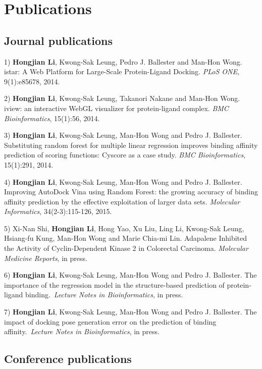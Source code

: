 \chapter{Publications}

\section{Journal publications}

1) \textbf{Hongjian Li}, Kwong-Sak Leung, Pedro J. Ballester and Man-Hon Wong. istar: A Web Platform for Large-Scale Protein-Ligand Docking. \textit{PLoS ONE}, 9(1):e85678, 2014.

2) \textbf{Hongjian Li}, Kwong-Sak Leung, Takanori Nakane and Man-Hon Wong. iview: an interactive WebGL visualizer for protein-ligand complex. \textit{BMC Bioinformatics}, 15(1):56, 2014.

3) \textbf{Hongjian Li}, Kwong-Sak Leung, Man-Hon Wong and Pedro J. Ballester. Substituting random forest for multiple linear regression improves binding affinity prediction of scoring functions: Cyscore as a case study. \textit{BMC Bioinformatics}, 15(1):291, 2014.

4) \textbf{Hongjian Li}, Kwong-Sak Leung, Man-Hon Wong and Pedro J. Ballester. Improving AutoDock Vina using Random Forest: the growing accuracy of binding affinity prediction by the effective exploitation of larger data sets. \textit{Molecular Informatics}, 34(2-3):115-126, 2015.

5) Xi-Nan Shi, \textbf{Hongjian Li}, Hong Yao, Xu Liu, Ling Li, Kwong-Sak Leung, Hsiang-fu Kung, Man-Hon Wong and Marie Chia-mi Lin. Adapalene Inhibited the Activity of Cyclin-Dependent Kinase 2 in Colorectal Carcinoma. \textit{Molecular Medicine Reports}, in press.

6) \textbf{Hongjian Li}, Kwong-Sak Leung, Man-Hon Wong and Pedro J. Ballester. The importance of the regression model in the structure-based prediction of protein-ligand binding. \textit{Lecture Notes in Bioinformatics}, in press.

7) \textbf{Hongjian Li}, Kwong-Sak Leung, Man-Hon Wong and Pedro J. Ballester. The impact of docking pose generation error on the prediction of binding affinity. \textit{Lecture Notes in Bioinformatics}, in press.

\section{Conference publications}


